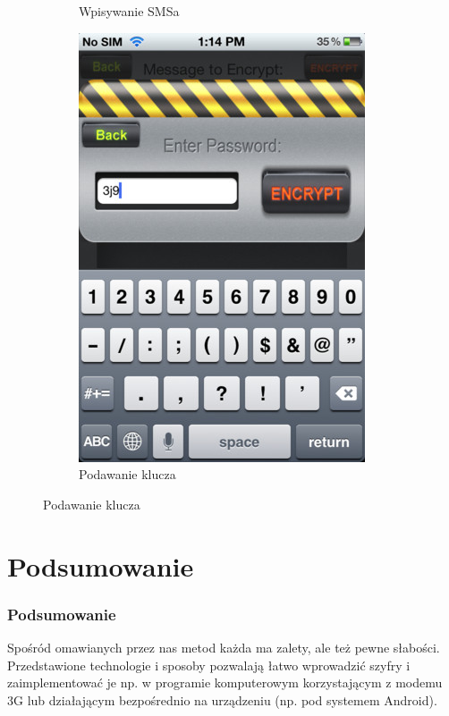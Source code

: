\documentclass[xcolor=table]{beamer}
\begin{document}
\begin{frame}
\begin{center}
\begin{figure}
\begin{subfigure}[b]{0.4\textwidth}
              \caption{Wpisywanie SMSa}
            \end{subfigure}
            \quad
             \begin{subfigure}[b]{0.4\textwidth}
              \centering
              \includegraphics[width=\textwidth]{secure_texting_2}
              \caption{Podawanie klucza}
            \end{subfigure}       
        \end{figure}
      \end{center}
\end{frame}

\section{Podsumowanie}

\begin{frame}
  \frametitle{Podsumowanie}
Spośród omawianych przez nas metod każda ma zalety, ale też pewne słabości.\\[\baselineskip] Przedstawione technologie i sposoby pozwalają łatwo wprowadzić szyfry i zaimplementować je np. w programie komputerowym korzystającym z modemu 3G lub działającym bezpośrednio na urządzeniu (np. pod systemem Android).

\end{frame}
\end{document}
